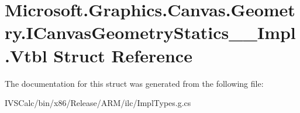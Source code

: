 \hypertarget{struct_microsoft_1_1_graphics_1_1_canvas_1_1_geometry_1_1_i_canvas_geometry_statics_____impl_1_1_vtbl}{}\section{Microsoft.\+Graphics.\+Canvas.\+Geometry.\+I\+Canvas\+Geometry\+Statics\+\_\+\+\_\+\+Impl.\+Vtbl Struct Reference}
\label{struct_microsoft_1_1_graphics_1_1_canvas_1_1_geometry_1_1_i_canvas_geometry_statics_____impl_1_1_vtbl}


The documentation for this struct was generated from the following file\+:\begin{DoxyCompactItemize}
\item 
I\+V\+S\+Calc/bin/x86/\+Release/\+A\+R\+M/ilc/Impl\+Types.\+g.\+cs\end{DoxyCompactItemize}
